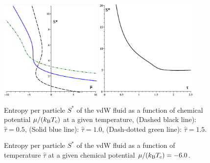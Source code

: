 \documentclass[12pt]{article}
\numberwithin{equation}{section}
\begin{document}
	\begin{figure}[htbp]
		\includegraphics[width=0.45\textwidth,angle=0]{vdw_S_vs_mu}
		\hfill
		\includegraphics[width=0.45\textwidth,angle=0]{vdw_S_vs_t_at_mu}
		\\
		\parbox{0.45\textwidth}{\caption{\label{fig:vdw_S_vs_mu} Entropy per particle $S^{*}$ of the vdW fluid as a function of chemical potential $\mu/(k_{\rm B}T_c)$ at a given temperature, (Dashed black line): $\hat{\tau}=0.5$, (Solid blue line): $\hat{\tau}=1.0$, (Dash-dotted green line): $\hat{\tau}=1.5$.}}
		\hfill
		\parbox{0.45\textwidth}{\caption{\label{fig:vdw_S_vs_t_at_mu} Entropy per particle $S^{*}$ of the vdW fluid as a function of temperature $\hat{\tau}$ at a given chemical potential $\mu/(k_{\rm B}T_c) = -6.0$.}}
	\end{figure}
	
	\pagebreak
	
	

	\pagebreak	
	
	
	
\end{document}
